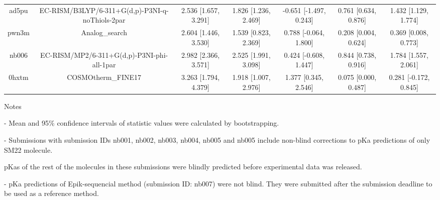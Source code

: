 \documentclass{article}
\begin{document}
\begin{center}
\begin{longtable}{|ccccccc|}
 ad5pu &    EC-RISM/B3LYP/6-311+G(d,p)-P3NI-q-noThiols-2par &  2.536 [1.657, 3.291] &  1.826 [1.236, 2.469] &   -0.651 [-1.497, 0.243] &  0.761 [0.634, 0.876] &   1.432 [1.129, 1.774] \\
 pwn3m &                                     Analog\_search &  2.604 [1.446, 3.530] &  1.539 [0.823, 2.369] &    0.788 [-0.064, 1.800] &  0.208 [0.004, 0.624] &   0.369 [0.008, 0.773] \\
 nb006 &         EC-RISM/MP2/6-311+G(d,p)-P3NI-phi-all-1par &  2.982 [2.366, 3.571] &  2.525 [1.991, 3.098] &    0.424 [-0.608, 1.447] &  0.844 [0.738, 0.916] &   1.784 [1.557, 2.061] \\
 0hxtm &                                 COSMOtherm\_FINE17 &  3.263 [1.794, 4.379] &  1.918 [1.007, 2.976] &     1.377 [0.345, 2.546] &  0.075 [0.000, 0.487] &  0.281 [-0.172, 0.845] \\
\end{longtable}
\end{center}

Notes

- Mean and 95\% confidence intervals of statistic values were calculated by bootstrapping.

- Submissions with submission IDs nb001, nb002, nb003, nb004, nb005 and nb005 include non-blind corrections to pKa predictions of only SM22 molecule.

pKas of the rest of the molecules in these submissions were blindly predicted before experimental data was released.

- pKa predictions of Epik-sequencial method (submission ID: nb007) were not blind. They were submitted after the submission deadline to be used as a reference method.
\end{document}
